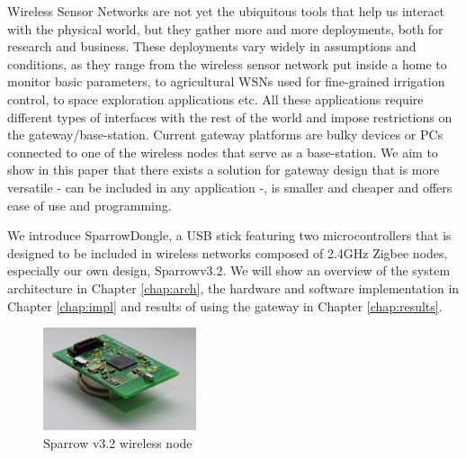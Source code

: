 Wireless Sensor Networks are not yet the ubiquitous tools that help us interact
with the physical world, but they gather more and more deployments, both for
research and business. These deployments vary widely in assumptions and
conditions, as they range from the wireless sensor network put inside a home to
monitor basic parameters, to agricultural WSNs
\cite{burrell2004vineyard,baggio2005wireless} used for fine-grained irrigation
control, to space exploration applications \cite{ulmer2003wireless} etc. All
these applications require different types of interfaces with the rest of the
world and impose restrictions on the gateway/base-station. Current gateway
platforms \cite{hill2004platforms,da2011design,da2011design2} are bulky devices
or PCs connected to one of the wireless nodes that serve as a base-station. We
aim to show in this paper that there exists a solution for gateway design that
is more versatile - can be included in any application -, is smaller and
cheaper and offers ease of use and programming.

We introduce SparrowDongle, a USB stick featuring two microcontrollers that is
designed to be included in wireless networks composed of 2.4GHz Zigbee nodes,
especially our own design, Sparrowv3.2. We will show an overview of the system
architecture in Chapter \ref{chap:arch}, the hardware and software
implementation in Chapter \ref{chap:impl} and results of using the gateway in
Chapter \ref{chap:results}. 

\begin{figure}[ht] \centering
\includegraphics[width=0.4\textwidth]{img/Sparrowv32.jpg} \caption{Sparrow v3.2
wireless node} \end{figure}


